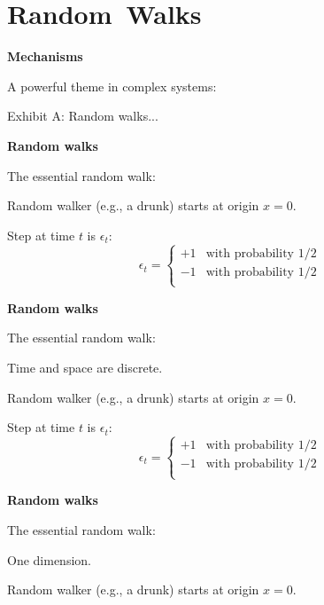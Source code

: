 \section{Random\ Walks}

  \textbf{Mechanisms}

  A powerful theme in complex systems: \\

  {
    \alert{Exhibit A:} Random walks...
  }


  \textbf{Random walks}

  The essential random walk:

  \inv


  Random walker (e.g., a drunk) starts at origin $x=0$.

  Step at time $t$ is $\epsilon_t$:
  $$
  \epsilon_t = 
  \left\{
    \begin{array}{ll}
      +1 & \mbox{with probability 1/2} \\
      -1 & \mbox{with probability 1/2} \\
    \end{array}
  \right.
  $$


  \textbf{Random walks}

  The essential random walk:


  \inv

   Time and space are discrete.

  Random walker (e.g., a drunk) starts at origin $x=0$.

  Step at time $t$ is $\epsilon_t$:
  $$
  \epsilon_t = 
  \left\{
    \begin{array}{ll}
      +1 & \mbox{with probability 1/2} \\
      -1 & \mbox{with probability 1/2} \\
    \end{array}
  \right.
  $$


  \textbf{Random walks}

  The essential random walk:

   One dimension.


  \inv

  Random walker (e.g., a drunk) starts at origin $x=0$.

